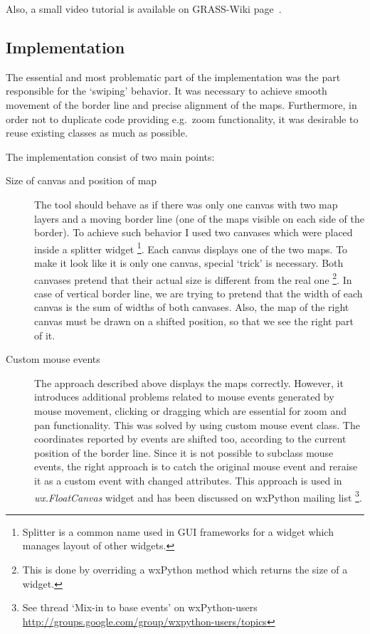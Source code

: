 \documentclass[a4paper,12pt,oneside]{book}
\begin{document}
Also, a small video tutorial is available on GRASS-Wiki page~\cite{mapswipeWiki}.

\subsection{Implementation}
The essential and most problematic part of the implementation was the part responsible
for the `swiping' behavior. It was necessary to achieve smooth movement of the border line
and precise alignment of the maps. Furthermore, in order not to duplicate code providing
e.g.\ zoom functionality, it was desirable to reuse existing classes as much as possible.

\noindent The implementation consist of two main points:
    \begin{description}
      \item [Size of canvas and position of map] The tool should behave as if there was only one canvas with two map layers
      and a moving border line (one of the maps visible on each side of the border).
      To achieve such behavior I used two canvases which were placed inside a splitter widget%
      \footnote{Splitter is a common name used in GUI frameworks for a widget which manages layout of other widgets.}.
      Each canvas displays one of the two maps. To make it look like it is only one canvas,
      special `trick' is necessary. Both canvases pretend that their actual size is different from the real one%
      \footnote{This is done by overriding a wxPython method which returns the size of a widget.}.
      In case of vertical border line, we are trying to pretend
      that the width of each canvas is the sum of widths of both canvases.
      Also, the map of the right canvas must be drawn on a shifted position, so that we see the right part of it.
      
      \item [Custom mouse events] The approach described above displays the maps correctly.
      However, it introduces additional problems related to mouse events generated by mouse movement,
      clicking or dragging which are essential for zoom and pan functionality.
      This was solved by using custom mouse event class. The coordinates reported by events are shifted too,
      according to the current position of the border line. Since it is not possible to subclass mouse events,
      the right approach is to catch the original mouse event and reraise it as a custom event with changed attributes.
      This approach is used in \emph{wx.FloatCanvas} widget and has been discussed on wxPython mailing list%
      \footnote{See thread `Mix-in to base events' on wxPython-users \url{http://groups.google.com/group/wxpython-users/topics}}.
    \end{description}
\end{document}
